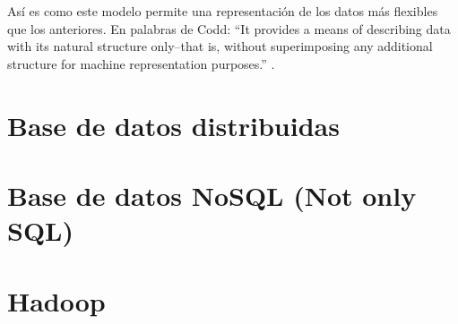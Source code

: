 \documentclass[12pt]{article}
\begin{document}
    Así es como este modelo permite una representación de los datos más flexibles que los anteriores. En palabras de Codd: ``It provides a means of describing data with its natural structure only--that is, without superimposing any additional structure for machine representation purposes.'' \cite{Codd_RelationalModelofDataLargeSharedDataBanks}.



  
  \section{Base de datos distribuidas}


  \section{Base de datos NoSQL (Not only SQL)}

    
    \section{Hadoop}

\end{document}
